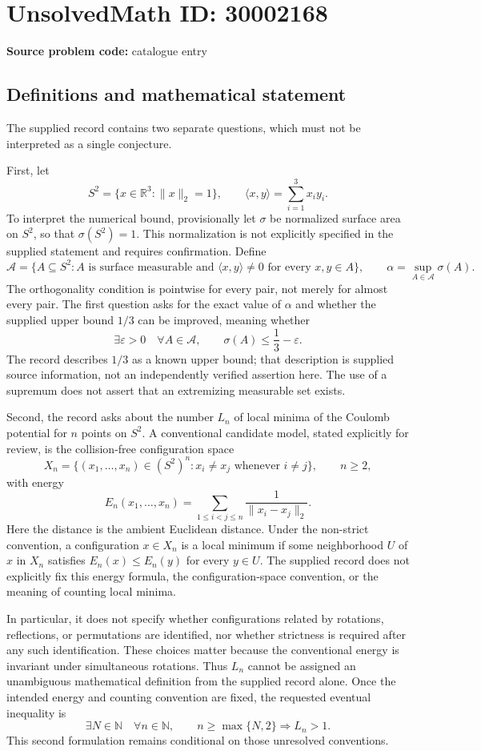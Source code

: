 \documentclass[11pt]{article}
\newcommand{\N}{\mathbb{N}}
\newcommand{\R}{\mathbb{R}}
\begin{document}
\section*{UnsolvedMath ID: 30002168}
\textbf{Source problem code:} catalogue entry
\subsection{Definitions and mathematical statement}
The supplied record contains two separate questions, which must not be interpreted as a single conjecture.

First, let
\[
S^2=\{x\in\R^3:\|x\|_2=1\},\qquad
\langle x,y\rangle=\sum_{i=1}^3x_i y_i.
\]
To interpret the numerical bound, provisionally let \(\sigma\) be normalized surface area on \(S^2\), so that \(\sigma(S^2)=1\). This normalization is not explicitly specified in the supplied statement and requires confirmation. Define
\[
\mathcal A=\{A\subseteq S^2:A\text{ is surface measurable and }\langle x,y\rangle\ne0\text{ for every }x,y\in A\},
\qquad
\alpha=\sup_{A\in\mathcal A}\sigma(A).
\]
The orthogonality condition is pointwise for every pair, not merely for almost every pair. The first question asks for the exact value of \(\alpha\) and whether the supplied upper bound \(1/3\) can be improved, meaning whether
\[
\exists\varepsilon>0\quad\forall A\in\mathcal A,
\qquad \sigma(A)\le\frac13-\varepsilon.
\]
The record describes \(1/3\) as a known upper bound; that description is supplied source information, not an independently verified assertion here. The use of a supremum does not assert that an extremizing measurable set exists.

Second, the record asks about the number \(L_n\) of local minima of the Coulomb potential for \(n\) points on \(S^2\). A conventional candidate model, stated explicitly for review, is the collision-free configuration space
\[
X_n=\{(x_1,\ldots,x_n)\in(S^2)^n:x_i\ne x_j\text{ whenever }i\ne j\},\qquad n\ge2,
\]
with energy
\[
E_n(x_1,\ldots,x_n)=\sum_{1\le i<j\le n}\frac1{\|x_i-x_j\|_2}.
\]
Here the distance is the ambient Euclidean distance. Under the non-strict convention, a configuration \(x\in X_n\) is a local minimum if some neighborhood \(U\) of \(x\) in \(X_n\) satisfies \(E_n(x)\le E_n(y)\) for every \(y\in U\). The supplied record does not explicitly fix this energy formula, the configuration-space convention, or the meaning of counting local minima.

In particular, it does not specify whether configurations related by rotations, reflections, or permutations are identified, nor whether strictness is required after any such identification. These choices matter because the conventional energy is invariant under simultaneous rotations. Thus \(L_n\) cannot be assigned an unambiguous mathematical definition from the supplied record alone. Once the intended energy and counting convention are fixed, the requested eventual inequality is
\[
\exists N\in\N\quad\forall n\in\N,\qquad n\ge\max\{N,2\}\Longrightarrow L_n>1.
\]
This second formulation remains conditional on those unresolved conventions.
\end{document}

